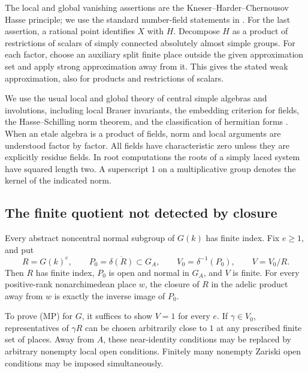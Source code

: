 The local and global vanishing assertions are the Kneser--Harder--Chernousov
Hasse principle; we use the standard number-field statements in
\cite[Theorems~6.4 and~6.6]{PRbook}.  For the last assertion, a rational point identifies
\(X\) with \(H\).  Decompose \(H\) as a product of restrictions of scalars
of simply connected absolutely almost simple groups.  For each factor,
choose an auxiliary split finite place outside the given approximation
set and apply strong approximation away from it.  This gives the stated
weak approximation, also for products and restrictions of scalars.

We use the usual local and global theory of central simple algebras
and involutions, including local Brauer invariants, the embedding
criterion for fields, the Hasse--Schilling norm theorem, and the
classification of hermitian forms
\cite{PRbook,Reiner,KMRT}.  When an etale algebra is a product of fields,
norm and local arguments are understood factor by factor.  All fields
have characteristic zero unless they are explicitly residue fields.
In root computations the roots of a simply laced system have squared
length two.  A superscript \(1\) on a multiplicative group denotes
the kernel of the indicated norm.

\subsection{The finite quotient not detected by closure}

\begin{proposition}\label{prop:finite-defect}
Every abstract noncentral normal subgroup of \(G(k)\) has finite index.
Fix \(e\geq1\), and put
\[
 R=G(k)^e,\qquad
 P_0=\overline{\delta(R)}\subset G_A,\qquad
 V_0=\delta^{-1}(P_0),\qquad V=V_0/R.
\]
Then \(R\) has finite index, \(P_0\) is open and normal in \(G_A\),
and \(V\) is finite.  For every positive-rank nonarchimedean place
\(w\), the closure of \(R\) in the adelic product away from \(w\)
is exactly the inverse image of \(P_0\).

To prove (MP) for \(G\), it suffices to show \(V=1\) for every \(e\).
If \(\gamma\in V_0\), representatives of \(\gamma R\) can be chosen
arbitrarily close to \(1\) at any prescribed finite set of places.
Away from \(A\), these near-identity conditions may be replaced by
arbitrary nonempty local open conditions.  Finitely many nonempty
Zariski open conditions may be imposed simultaneously.
\end{proposition}

